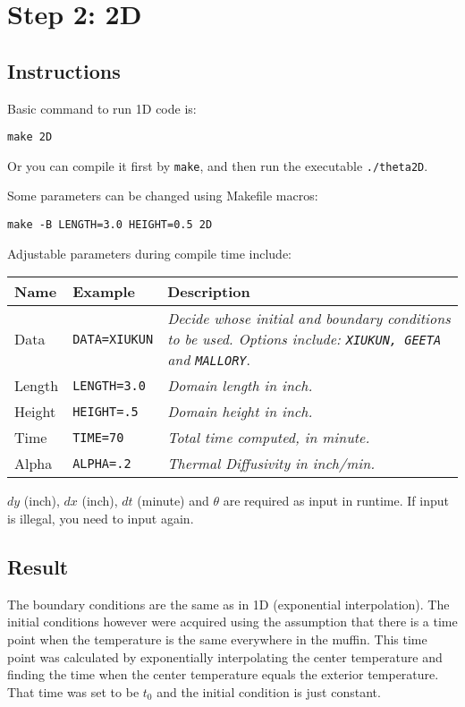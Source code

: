 \documentclass[letterpaper,12pt,fleqn]{article}
\newcommand{\mybox}[1]{\par\noindent\colorbox{shadecolor}
{\parbox{\dimexpr\textwidth-2\fboxsep\relax}{\tt #1}}}
\newcommand{\code}[1]{\colorbox{shadecolor}{\tt #1}}
\begin{document}
\section{Step 2: 2D}
\subsection{Instructions}
Basic command to run 1D code is:
\mybox{make 2D}

Or you can compile it first by \code{make}, and then run the executable \code{./theta2D}\;.

Some parameters can be changed using Makefile macros:
\mybox{make -B LENGTH=3.0 HEIGHT=0.5 2D}

Adjustable parameters during compile time include:
\begin{table}[h]
  \begin{tabular}{p{2cm} p{3.3cm} p{7cm}}
    \toprule
    \textbf{Name} & \textbf{Example} & \textbf{Description}\\
    \midrule
    Data    &	\code{DATA=XIUKUN}    &	  \textit{Decide whose initial and boundary conditions to be used.
      Options include:
  \texttt{XIUKUN, GEETA} and \texttt{MALLORY}}.\\
    Length  &	\code{LENGTH=3.0}     &	  \textit{Domain length in inch.}\\
    Height  &	\code{HEIGHT=.5}      &	  \textit{Domain height in inch.}\\
    Time    &	\code{TIME=70}	      &	  \textit{Total time computed, in minute.}\\
    Alpha   &	\code{ALPHA=.2}	      &	  \textit{Thermal Diffusivity in inch/min.}\\
    \bottomrule
  \end{tabular}
\end{table}

$dy$ (inch), $dx$ (inch), $dt$ (minute) and $\theta$ are required as input in runtime.
If input is illegal, you need to input again.

\subsection{Result}
The boundary conditions are the same as in 1D (exponential interpolation).
The initial conditions however were acquired using the assumption that
there is a time point when the temperature is the same everywhere in the muffin.
This time point was calculated by exponentially interpolating the center temperature
and finding the time when the center temperature equals the exterior temperature.
That time was set to be $t_0$ and the initial condition is just constant.
\end{document}

